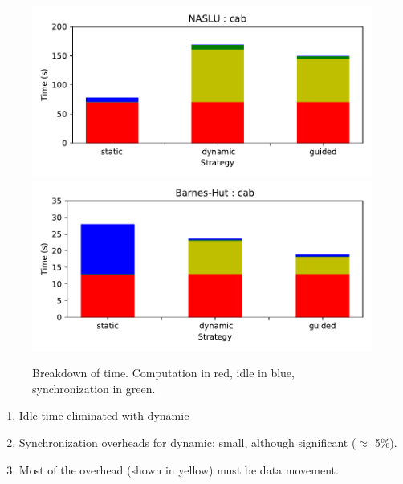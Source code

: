 {\begin{frame}[label=execTimings]
\begin{figure}[ht!]
\label{fig:dmTimes-cab}
\begin{center}
\includegraphics[scale=0.35]{./plots/dmTime-NASLU-cab}
\includegraphics[scale=0.35]{./plots/dmTime-nbody-cab}
\end{center}
\caption{\label{fig:dmTimes-cab} \tiny Breakdown of time. Computation in red, idle in blue, synchronization in green.}
\end{figure}
\begin{enumerate}
\small \item \small Idle time eliminated with dynamic
\small \item \small Synchronization overheads for dynamic: small,
although significant ($\approx$ 5\%).
\item \small Most of the overhead (shown in yellow) must be data movement.
\end{enumerate}
\end{frame}

}
